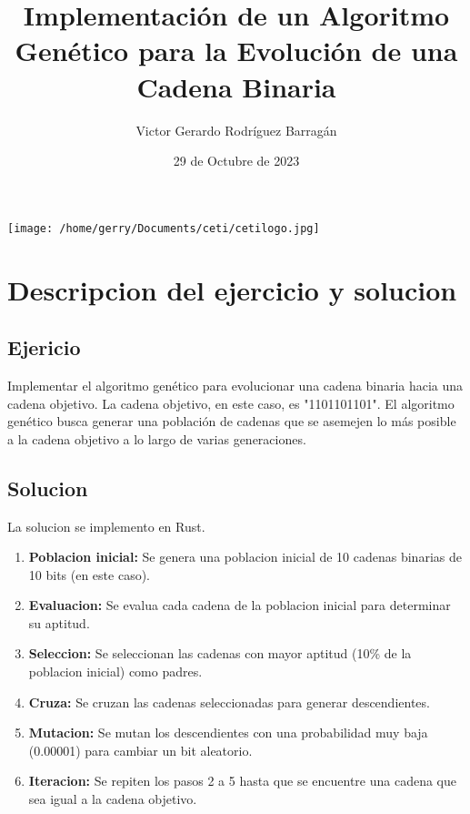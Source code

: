 \documentclass{article}
\title{Implementación de un Algoritmo Genético para la Evolución de una Cadena Binaria}
\author{Victor Gerardo Rodríguez Barragán}
\date{29 de Octubre de 2023}
\begin{document}
\maketitle
\begin{center}
    \texttt{[image: /home/gerry/Documents/ceti/cetilogo.jpg]}
\end{center}

\newpage
\justify
\section{Descripcion del ejercicio y solucion}
\subsection{Ejericio}
Implementar el algoritmo genético para evolucionar una cadena binaria hacia una cadena objetivo.
La cadena objetivo, en este caso, es "1101101101".
El algoritmo genético busca generar una población de cadenas que se asemejen lo más posible a
la cadena objetivo a lo largo de varias generaciones.
\subsection{Solucion}
La solucion se implemento en Rust.
\begin{enumerate}
\item \textbf{Poblacion inicial:} Se genera una poblacion inicial de 10 cadenas binarias de 10 bits (en este caso).
\item \textbf{Evaluacion:} Se evalua cada cadena de la poblacion inicial para determinar su aptitud.
\item \textbf{Seleccion:} Se seleccionan las cadenas con mayor aptitud (10\% de la poblacion inicial) como padres.
\item \textbf{Cruza:} Se cruzan las cadenas seleccionadas para generar descendientes.
\item \textbf{Mutacion:} Se mutan los descendientes con una probabilidad muy baja (0.00001) para cambiar un bit aleatorio.
\item \textbf{Iteracion:} Se repiten los pasos 2 a 5 hasta que se encuentre una cadena que sea igual a la cadena objetivo.
\end{enumerate}
\end{document}
